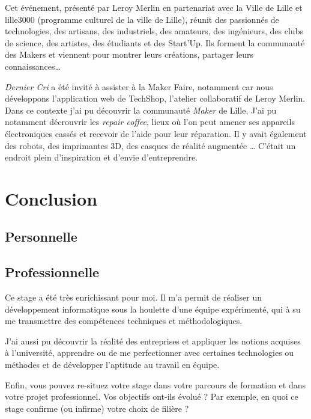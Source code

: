 \bigskip

Cet événement, présenté par Leroy Merlin en partenariat avec la Ville de
Lille et lille3000 (programme culturel de la ville de Lille), réunit des
passionnés de technologies, des artisans, des industriels, des amateurs,
des ingénieurs, des clubs de science, des artistes, des étudiants et des
Start'Up. Ils forment la communauté des Makers et viennent pour montrer
leurs créations, partager leurs connaissances\ldots{}

\bigskip

\emph{Dernier Cri} a été invité à assister à la Maker Faire, notamment
car nous développons l'application web de TechShop, l'atelier
collaboratif de Leroy Merlin. Dans ce contexte j'ai pu découvrir la
communauté \emph{Maker} de Lille. J'ai pu notamment décrouvrir les
\emph{repair coffee}, lieux où l'on peut amener ses appareils
électroniques cassés et recevoir de l'aide pour leur réparation. Il y
avait également des robots, des imprimantes 3D, des casques de réalité
augmentée \ldots{} C'était un endroit plein d'inspiration et d'envie
d'entreprendre.

\newpage

\section{Conclusion}\label{conclusion-2}

\subsection{Personnelle}\label{personnelle}

\subsection{Professionnelle}\label{professionnelle}

Ce stage a été très enrichissant pour moi. Il m'a permit de réaliser un
développement informatique sous la houlette d'une équipe expérimenté,
qui à su me transmettre des compétences techniques et méthodologiques.

J'ai aussi pu découvrir la réalité des entreprises et appliquer les
notions acquises à l'université, apprendre ou de me perfectionner avec
certaines technologies ou méthodes et de développer l'aptitude au
travail en équipe.

Enfin, vous pouvez re-situez votre stage dans votre parcours de
formation et dans votre projet professionnel. Vos objectifs ont-ils
évolué ? Par exemple, en quoi ce stage confirme (ou infirme) votre choix
de filière ?

